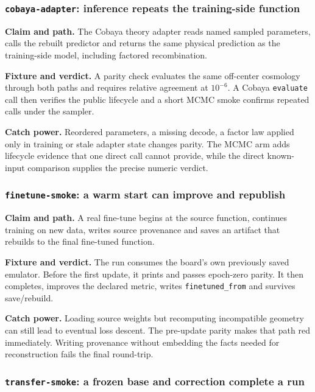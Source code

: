 \documentclass[10pt,aps,prd,twocolumn,nofootinbib]{revtex4-2}
\newcommand{\code}[1]{\texttt{#1}}
\begin{document}
\subsubsection{\code{cobaya-adapter}: inference repeats the training-side function}

\textbf{Claim and path.}  The Cobaya theory adapter reads named sampled
parameters, calls the rebuilt predictor and returns the same physical
prediction as the training-side model, including factored recombination.

\textbf{Fixture and verdict.}  A parity check evaluates the same off-center
cosmology through both paths and requires relative agreement at
\(10^{-6}\).  A Cobaya \code{evaluate} call then verifies the public lifecycle
and a short MCMC smoke confirms repeated calls under the sampler.

\textbf{Catch power.}  Reordered parameters, a missing decode, a factor law
applied only in training or stale adapter state changes parity.  The MCMC arm
adds lifecycle evidence that one direct call cannot provide, while the direct
known-input comparison supplies the precise numeric verdict.

\subsubsection{\code{finetune-smoke}: a warm start can improve and republish}

\textbf{Claim and path.}  A real fine-tune begins at the source function,
continues training on new data, writes source provenance and saves an
artifact that rebuilds to the final fine-tuned function.

\textbf{Fixture and verdict.}  The run consumes the board's own previously
saved emulator.  Before the first update, it prints and passes epoch-zero
parity.  It then completes, improves the declared metric, writes
\code{finetuned\_from} and survives save/rebuild.

\textbf{Catch power.}  Loading source weights but recomputing incompatible
geometry can still lead to eventual loss descent.  The pre-update parity makes
that path red immediately.  Writing provenance without embedding the facts
needed for reconstruction fails the final round-trip.

\subsubsection{\code{transfer-smoke}: a frozen base and correction complete a run}
\end{document}
